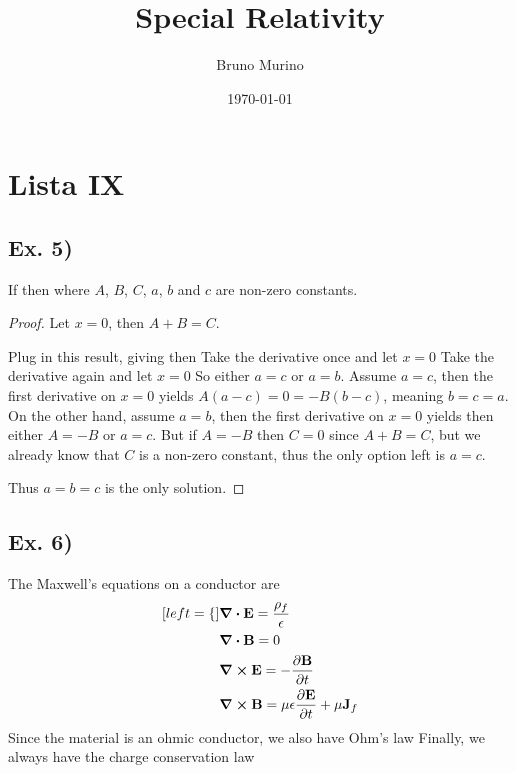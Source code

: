 \documentclass[oneside, 10pt, notitlepage]{book}
\title{Special Relativity} %
\author{Bruno Murino} %
\date{\today} %
\begin{document}
\chapter{Lista IX}

\section*{Ex. 5)}

If
then
where \(A\), \(B\), \(C\), \(a\), \(b\) and \(c\) are non-zero constants.\par 

\begin{proof}
    Let \(x=0\), then \(A+B=C\).\par 
    Plug in this result, giving
    then
    Take the derivative once and let \(x=0\)
    Take the derivative again and let \(x=0\)
    So either \(a=c\) or \(a=b\). Assume \(a=c\), then the first derivative on \(x=0\) yields \(A(a-c) = 0 = -B(b-c)\), meaning \(b=c=a\). On the other hand, assume \(a=b\), then the first derivative on \(x=0\) yields 
    then either \(A=-B\) or \(a=c\). But if \(A=-B\) then \(C=0\) since \(A+B=C\), but we already know that \(C\) is a non-zero constant, thus the only option left is \(a=c\).\par 
    
    Thus \(a=b=c\) is the only solution.\par 
\end{proof}

\section*{Ex. 6)}

The Maxwell's equations on a conductor are
\begin{subequations}
    \begin{align}[left = \empheqlbrace\,]
    & \div{\vb{E}} = \frac{\rho_f}{\epsilon} \\
	& \div{\vb{B}} = 0 \\
	& \curl{\vb{E}} = -\pdv{\vb{B}}{t} \\
	& \curl{\vb{B}} = \mu \epsilon \pdv{\vb{E}}{t} + \mu \vb{J}_f
    \end{align}
\end{subequations}
Since the material is an ohmic conductor, we also have Ohm's law
Finally, we always have the charge conservation law
\par 
\end{document}
